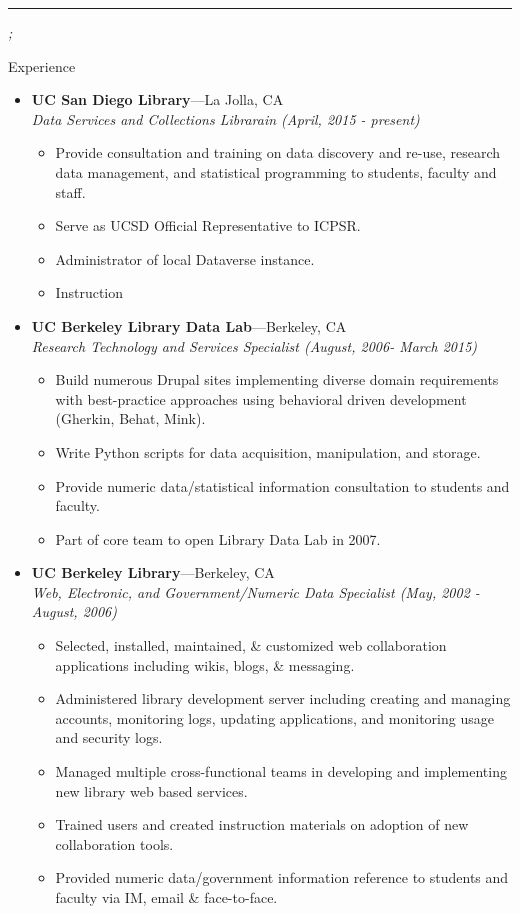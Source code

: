 \documentclass[11pt,oneside]{article}
\newcommand{\bigname}[1]{
	\begin{center}\fontfamily{phv}\selectfont\Huge\scshape#1\end{center}
}
\newenvironment{ressection}[1]{
	\vspace{4pt}
	{\fontfamily{phv}\selectfont\Large#1}
	\begin{itemize}
	\vspace{3pt}
}{
	\end{itemize}
}
\newcommand{\ressubitem}[1]{
	\vspace{-1pt}
	\item \begin{flushleft} #1 \end{flushleft}
}
\newcommand{\resbigitem}[3]{
	\vspace{-5pt}
	\item
	\textbf{#1}---#2 \\
	\textit{#3}
}
\newenvironment{ressubsec}[3]{
	\resbigitem{#1}{#2}{#3}
	\vspace{-2pt}
	\begin{itemize}
}{
	\end{itemize}
}
\begin{document}
 \selectfont

\bigname{\name}

\vspace{-8pt} \rule{\textwidth}{1pt}

\vspace{-1pt} {\small\itshape \addr \hfill \phone; \email}

\vspace{8 pt}

\thispagestyle{empty}


\begin{ressection}{Experience}
	\begin{ressubsec}{UC San Diego Library}{La Jolla, CA}{Data Services and Collections Librarain (April, 2015 - present)}
		\ressubitem{Provide consultation and training on data discovery and re-use, research data management, and statistical programming to students, faculty and staff.}
		\ressubitem{Serve as UCSD Official Representative to ICPSR.}
		\ressubitem{Administrator of local Dataverse instance.}
		\ressubitem{Instruction}
	\end{ressubsec}

	\begin{ressubsec}{UC Berkeley Library Data Lab}{Berkeley, CA}{Research Technology and Services Specialist (August, 2006- March 2015)}
   		\ressubitem{Build numerous Drupal sites implementing diverse domain requirements with best-practice approaches using behavioral driven development (Gherkin, Behat, Mink).}
		\ressubitem{Write Python scripts for data acquisition, manipulation, and storage.}
		\ressubitem{Provide numeric data/statistical information consultation to students and faculty.}
		\ressubitem{Part of core team to open Library Data Lab in 2007.}
	\end{ressubsec}

	\begin{ressubsec}{UC Berkeley Library}{Berkeley, CA}{Web, Electronic, and Government/Numeric Data Specialist (May, 2002 - August, 2006)}
		\ressubitem{Selected, installed, maintained, \& customized web collaboration applications including wikis, blogs, \& messaging.}
		\ressubitem{Administered library development server including creating and managing accounts, monitoring logs, updating applications, and monitoring usage and security logs.}
		\ressubitem{Managed multiple cross-functional teams in developing and implementing new library web based services.}
		\ressubitem{Trained users and created instruction materials on adoption of new collaboration tools.}
		\ressubitem{Provided numeric data/government information reference to students and faculty via IM, email \& face-to-face.}		
	\end{ressubsec}
	

\end{ressection}
\end{document}

